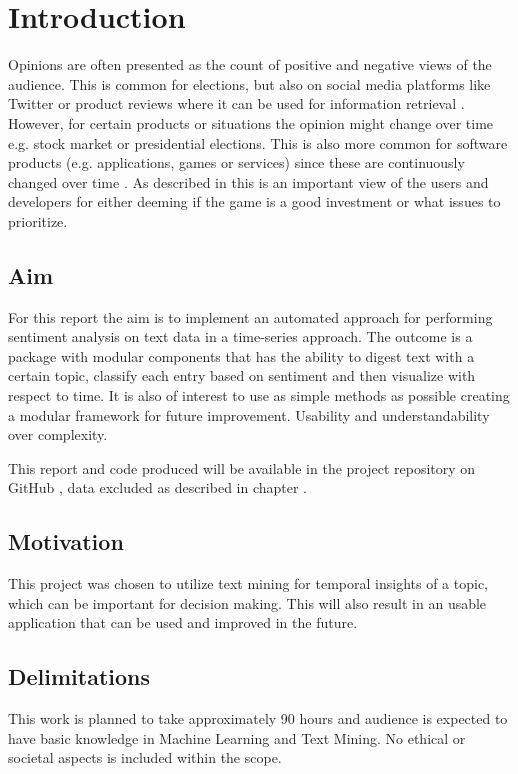\chapter{Introduction}
\label{cha:introduction}


Opinions are often presented as the count of positive and negative views of the audience. This is common for elections, 
but also on social media platforms like Twitter or product reviews where it can be used for information retrieval \cite{twitter_mining}. 
However, for certain products or situations the opinion might change over time e.g. stock market or presidential elections. 
This is also more common for software products (e.g. applications, games or services) since these are continuously changed over time \cite{steam_reviews}.
As described in \cite{steam_reviews} this is an important view of the users and developers for either deeming if the game is a good investment or what 
issues to prioritize.




\section{Aim}
\label{sec:aim}

For this report the aim is to implement an automated approach for performing sentiment analysis on text data in a time-series approach. 
The outcome is a package with modular components that has the ability to digest text with a certain topic, classify each entry based on sentiment and then visualize with respect to time.
It is also of interest to use as simple methods as possible creating a modular framework for future improvement. 
Usability and understandability over complexity.

This report and code produced will be available in the project repository on GitHub \cite{repository}, data excluded as described in chapter .


\section{Motivation}
\label{sec:motivation}

This project was chosen to utilize text mining for temporal insights of a topic, which can be important for decision making. This will also result in an usable application 
that can be used and improved in the future. 


\section{Delimitations}
\label{sec:delimitations}


This work is planned to take approximately 90 hours and audience is expected to have basic knowledge in Machine Learning and Text Mining. 
No ethical or societal aspects is included within the scope.